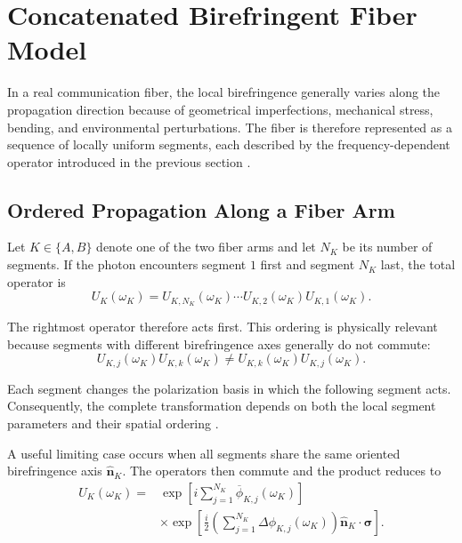\section{Concatenated Birefringent Fiber Model}
\label{sec:concatenated_birefringent_fiber}

In a real communication fiber, the local birefringence generally varies
along the propagation direction because of geometrical imperfections,
mechanical stress, bending, and environmental perturbations. The fiber is
therefore represented as a sequence of locally uniform segments, each
described by the frequency-dependent operator introduced in the previous
section
\cite{foschini_poole_statistical_pmd_1991,
wai_menyuk_random_birefringence_1996,
gordon_kogelnik_pmd_2000}.


\subsection{Ordered Propagation Along a Fiber Arm}
\label{subsec:ordered_segment_propagation}

Let \(K\in\{A,B\}\) denote one of the two fiber arms and let \(N_K\) be its
number of segments. If the photon encounters segment \(1\) first and segment
\(N_K\) last, the total operator is
%
\begin{equation}
    U_K(\omega_K)
    =
    U_{K,N_K}(\omega_K)
    \cdots
    U_{K,2}(\omega_K)
    U_{K,1}(\omega_K).
    \label{eq:arm_concatenated_fiber_operator}
\end{equation}

The rightmost operator therefore acts first. This ordering is physically
relevant because segments with different birefringence axes generally do not
commute:
%
\begin{equation}
    U_{K,j}(\omega_K)
    U_{K,k}(\omega_K)
    \neq
    U_{K,k}(\omega_K)
    U_{K,j}(\omega_K).
    \label{eq:segment_operator_noncommutativity}
\end{equation}

Each segment changes the polarization basis in which the following segment
acts. Consequently, the complete transformation depends on both the local
segment parameters and their spatial ordering
\cite{gordon_kogelnik_pmd_2000,
wai_menyuk_random_birefringence_1996}.

A useful limiting case occurs when all segments share the same oriented
birefringence axis \(\widehat{\mathbf n}_K\). The operators then commute and
the product reduces to
%
\begin{align}
    U_K(\omega_K)
    =
    &
    \exp
    \left[
        i
        \sum_{j=1}^{N_K}
        \overline{\phi}_{K,j}(\omega_K)
    \right]
    \nonumber\\
    &\times
    \exp
    \left[
        \frac{i}{2}
        \left(
            \sum_{j=1}^{N_K}
            \Delta\phi_{K,j}(\omega_K)
        \right)
        \widehat{\mathbf n}_K
        \cdot
        \boldsymbol{\sigma}
    \right].
    \label{eq:aligned_segments_total_operator}
\end{align}

